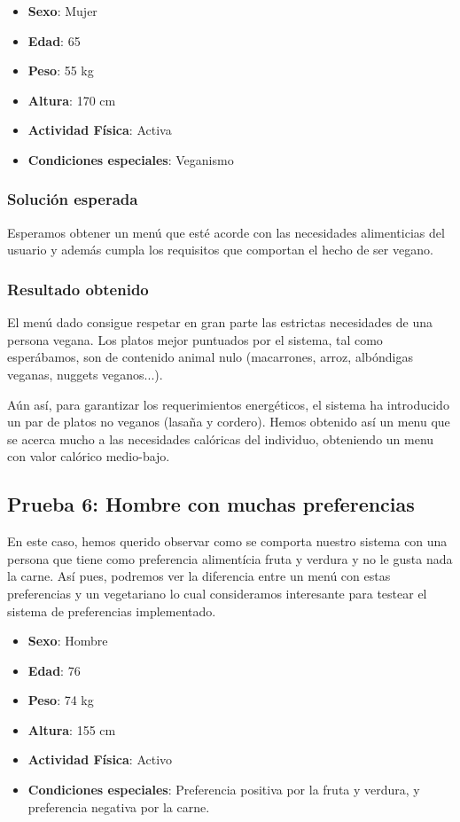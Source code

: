 \documentclass[11]{article}
\begin{document}
\begin{itemize}
\item \textbf{Sexo}: Mujer
\item \textbf{Edad}: 65
\item \textbf{Peso}: 55 kg
\item \textbf{Altura}: 170 cm
\item \textbf{Actividad Física}: Activa
\item \textbf{Condiciones especiales}: Veganismo
\end{itemize}

\subsubsection{Solución esperada}
Esperamos obtener un menú que esté acorde con las necesidades alimenticias del usuario y además cumpla los requisitos que comportan el hecho de ser vegano.

\subsubsection{Resultado obtenido}

El menú dado consigue respetar en gran parte las estrictas necesidades de una persona vegana.
Los platos mejor puntuados por el sistema, tal como esperábamos, son de contenido animal nulo (macarrones, arroz, albóndigas veganas, nuggets veganos...).

Aún así, para garantizar los requerimientos energéticos, el sistema ha introducido un par de platos no veganos (lasaña y cordero).
Hemos obtenido así un menu que se acerca mucho a las necesidades calóricas del individuo, obteniendo un menu con valor calórico medio-bajo.

\subsection{Prueba 6: Hombre con muchas preferencias}
En este caso, hemos querido observar como se comporta nuestro sistema con una persona que tiene como preferencia alimentícia fruta y verdura y no le gusta nada la carne. Así pues, podremos ver la diferencia entre un menú con estas preferencias y un vegetariano lo cual consideramos interesante para testear el sistema de preferencias implementado. 

\begin{itemize}
\item \textbf{Sexo}: Hombre
\item \textbf{Edad}: 76
\item \textbf{Peso}: 74 kg
\item \textbf{Altura}: 155 cm
\item \textbf{Actividad Física}: Activo
\item \textbf{Condiciones especiales}: Preferencia positiva por la fruta y verdura, y preferencia negativa por la carne.
\end{itemize}
\end{document}
